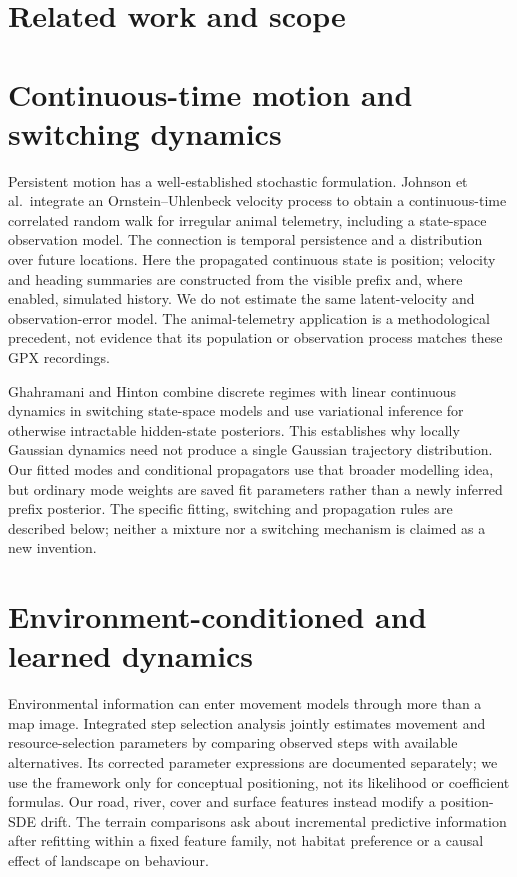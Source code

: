 \section{Related work and scope}\label{sec:related-work}\hypertarget{sec:related-work}{}

\section{Continuous-time motion and switching dynamics}
Persistent motion has a well-established stochastic formulation. Johnson
et al.\ integrate an Ornstein--Uhlenbeck velocity process to obtain a
continuous-time correlated random walk for irregular animal telemetry,
including a state-space observation model\cite{johnson2008}. The connection
is temporal persistence and a distribution over future locations. Here the
propagated continuous state is position; velocity and heading summaries are
constructed from the visible prefix and, where enabled, simulated history.
We do not estimate the same latent-velocity and observation-error model.
The animal-telemetry application is a methodological precedent, not evidence
that its population or observation process matches these GPX recordings.

Ghahramani and Hinton combine discrete regimes with linear continuous
dynamics in switching state-space models and use variational inference for
otherwise intractable hidden-state posteriors\cite{ghahramani2000}.
This establishes why locally Gaussian dynamics need not produce a single
Gaussian trajectory distribution. Our fitted modes and conditional
propagators use that broader modelling idea, but ordinary mode weights are
saved fit parameters rather than a newly inferred prefix posterior. The
specific fitting, switching and propagation rules are described below;
neither a mixture nor a switching mechanism is claimed as a new invention.


\section{Environment-conditioned and learned dynamics}
Environmental information can enter movement models through more than a
map image. Integrated step selection analysis jointly estimates movement
and resource-selection parameters by comparing observed steps with
available alternatives\cite{avgar2016}. Its corrected parameter expressions
are documented separately\cite{avgar2017correction}; we use the framework
only for conceptual positioning, not its likelihood or coefficient formulas.
Our road, river, cover and surface features instead modify a position-SDE
drift. The terrain comparisons ask about incremental predictive information
after refitting within a fixed feature family, not habitat preference or a
causal effect of landscape on behaviour.

